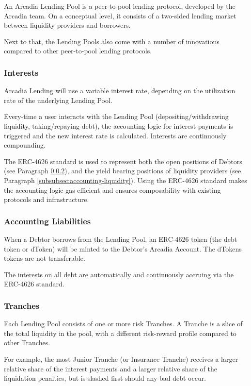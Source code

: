\documentclass[sigconf,nonacm]{acmart}
\begin{document}
An Arcadia Lending Pool is a peer-to-pool lending protocol, developed by the Arcadia team.
On a conceptual level, it consists of a two-sided lending market between liquidity providers and borrowers.

Next to that, the Lending Pools also come with a number of innovations compared to other peer-to-pool lending protocols.

\subsubsection{Interests}
Arcadia Lending will use a variable interest rate, depending on the utilization rate of the underlying Lending Pool.

Every-time a user interacts with the Lending Pool (depositing/withdrawing liquidity, taking/repaying debt),
the accounting logic for interest payments is triggered and the new interest rate is calculated.
Interests are continuously compounding.

The ERC-4626 standard is used to represent both the open positions of Debtors (see Paragraph \ref{subsubsec:accounting-liabilities}),
and the yield bearing positions of liquidity providers (see Paragraph \ref{subsubsec:accounting-liquidity}).
Using the ERC-4626 standard makes the accounting logic gas efficient and ensures composability with existing protocols and infrastructure.

\subsubsection{Accounting Liabilities}
\label{subsubsec:accounting-liabilities}
When a Debtor borrows from the Lending Pool,
an ERC-4626 token (the debt token or dToken) will be minted to the Debtor's Arcadia Account.
The dTokens tokens are not transferable.

The interests on all debt are automatically and continuously accruing via the ERC-4626 standard.

\subsubsection{Tranches}
Each Lending Pool consists of one or more risk Tranches.
A Tranche is a slice of the total liquidity in the pool, with a different risk-reward profile compared to other Tranches.

For example, the most Junior Tranche (or Insurance Tranche) receives a larger relative share of the interest payments and a larger relative share of the liquidation penalties,
but is slashed first should any bad debt occur.
\end{document}

